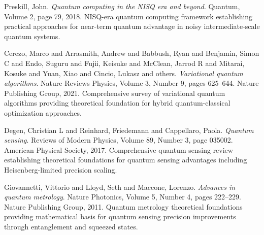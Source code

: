 \documentclass[12pt,a4paper]{article}
\begin{document}
\begin{thebibliography}{99}
Preskill, John.
\textit{Quantum computing in the NISQ era and beyond}.
Quantum, Volume 2, page 79, 2018.
NISQ-era quantum computing framework establishing practical approaches for near-term quantum advantage in noisy intermediate-scale quantum systems.

Cerezo, Marco and Arrasmith, Andrew and Babbush, Ryan and Benjamin, Simon C and Endo, Suguru and Fujii, Keisuke and McClean, Jarrod R and Mitarai, Kosuke and Yuan, Xiao and Cincio, Lukasz and others.
\textit{Variational quantum algorithms}.
Nature Reviews Physics, Volume 3, Number 9, pages 625--644. Nature Publishing Group, 2021.
Comprehensive survey of variational quantum algorithms providing theoretical foundation for hybrid quantum-classical optimization approaches.

Degen, Christian L and Reinhard, Friedemann and Cappellaro, Paola.
\textit{Quantum sensing}.
Reviews of Modern Physics, Volume 89, Number 3, page 035002. American Physical Society, 2017.
Comprehensive quantum sensing review establishing theoretical foundations for quantum sensing advantages including Heisenberg-limited precision scaling.

Giovannetti, Vittorio and Lloyd, Seth and Maccone, Lorenzo.
\textit{Advances in quantum metrology}.
Nature Photonics, Volume 5, Number 4, pages 222--229. Nature Publishing Group, 2011.
Quantum metrology theoretical foundations providing mathematical basis for quantum sensing precision improvements through entanglement and squeezed states.

\end{thebibliography}

\end{document}
